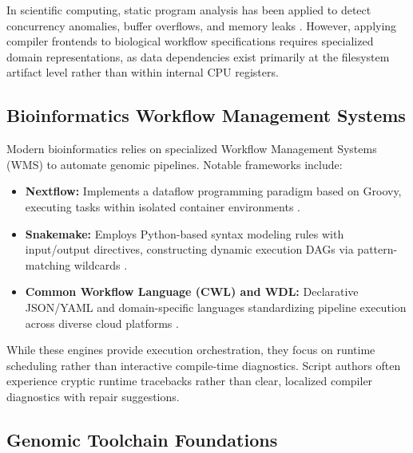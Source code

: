 \documentclass[12pt,a4paper]{article}
\begin{document}
In scientific computing, static program analysis has been applied to detect concurrency anomalies, buffer overflows, and memory leaks \cite{cousot1977}. However, applying compiler frontends to biological workflow specifications requires specialized domain representations, as data dependencies exist primarily at the filesystem artifact level rather than within internal CPU registers.

\subsection{Bioinformatics Workflow Management Systems}

Modern bioinformatics relies on specialized Workflow Management Systems (WMS) to automate genomic pipelines. Notable frameworks include:
\begin{itemize}
    \item \textbf{Nextflow:} Implements a dataflow programming paradigm based on Groovy, executing tasks within isolated container environments \cite{ditommaso2017}.
    \item \textbf{Snakemake:} Employs Python-based syntax modeling rules with input/output directives, constructing dynamic execution DAGs via pattern-matching wildcards \cite{koster2012}.
    \item \textbf{Common Workflow Language (CWL) and WDL:} Declarative JSON/YAML and domain-specific languages standardizing pipeline execution across diverse cloud platforms \cite{amstutz2016}.
\end{itemize}

While these engines provide execution orchestration, they focus on runtime scheduling rather than interactive compile-time diagnostics. Script authors often experience cryptic runtime tracebacks rather than clear, localized compiler diagnostics with repair suggestions.

\subsection{Genomic Toolchain Foundations}
\end{document}
